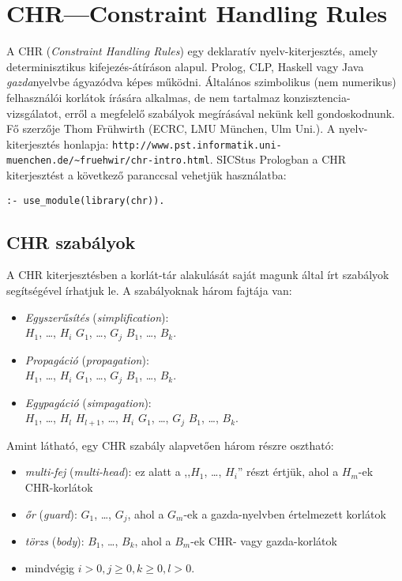 \clearpage

\chapter{CHR---Constraint Handling Rules}

A CHR (\emph{Constraint Handling Rules}) egy deklaratív nyelv-kiterjesztés,
amely determinisztikus kifejezés-átíráson alapul. Prolog, CLP, Haskell
vagy Java \emph{gazda}nyelvbe ágyazódva képes működni. Általános szimbolikus
(nem numerikus) felhasználói korlátok írására alkalmas, de nem tartalmaz
konzisztencia-vizsgálatot, erről a megfelelő szabályok megírásával
nekünk kell gondoskodnunk. Fő szerzője Thom Frühwirth (ECRC, LMU München, Ulm Uni.).
\br
A nyelv-kiterjesztés honlapja:
\verb'http://www.pst.informatik.uni-muenchen.de/~fruehwir/chr-intro.html'.
\br
SICStus Prologban a CHR kiterjesztést a következő paranccsal vehetjük használatba:
\begin{verbatim}
:- use_module(library(chr)).
\end{verbatim}

\section{CHR szabályok}

A CHR kiterjesztésben a korlát-tár alakulását saját magunk által írt szabályok
segítségével írhatjuk le. A szabályoknak három fajtája van:

\begin{itemize}
\item \emph{Egyszerűsítés} (\emph{simplification}):\\
 $H_1$, \ldots, $H_i$ \cd{<=>} $G_1$, \ldots, $G_j$ \cd{|} $B_1$,
 \ldots, $B_k$.
\item \emph{Propagáció} (\emph{propagation}):\\
 $H_1$, \ldots, $H_i$ \cd{==>} $G_1$, \ldots, $G_j$ \cd{|} $B_1$,
 \ldots, $B_k$. 
\item \emph{Egypagáció} (\emph{simpagation}):\\
 $H_1$, \ldots, $H_l$ \cd{\bs} $H_{l+1}$, \ldots, $H_i$ \cd{==>} $G_1$, \ldots, $G_j$ \cd{|} $B_1$,
 \ldots, $B_k$. 
\end{itemize}

Amint látható, egy CHR szabály alapvetően három részre osztható:

\begin{itemize}
\item \emph{multi-fej} (\emph{multi-head}): ez alatt a ,,$H_1$, \ldots, $H_i$'' részt
értjük, ahol a $H_m$-ek CHR-korlátok
\item \emph{őr} (\emph{guard}): $G_1$, \ldots, $G_j$, ahol a $G_m$-ek a gazda-nyelvben
értelmezett korlátok
\item \emph{törzs} (\emph{body}): $B_1$, \ldots, $B_k$, ahol a $B_m$-ek CHR- vagy
gazda-korlátok
\item mindvégig $i > 0, j \geq 0, k \geq 0, l > 0$.
\end{itemize}

